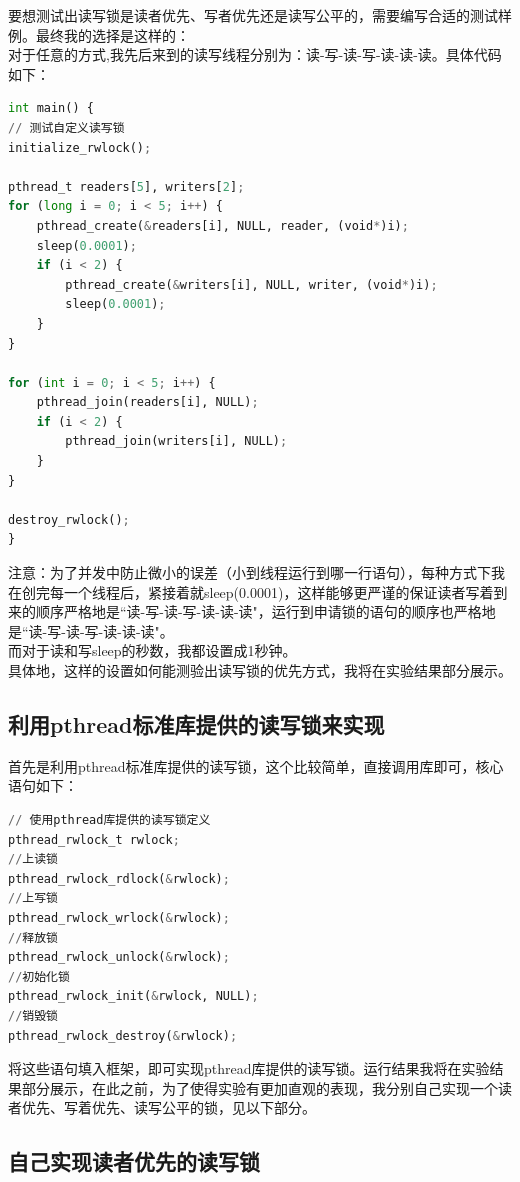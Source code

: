 \documentclass{LabReport}
\begin{document}
要想测试出读写锁是读者优先、写者优先还是读写公平的，需要编写合适的测试样例。最终我的选择是这样的：\\
对于任意的方式,我先后来到的读写线程分别为：读-写-读-写-读-读-读。具体代码如下：
\begin{lstlisting}[language=python,frame=shadowbox]
int main() {
// 测试自定义读写锁
initialize_rwlock();
	
pthread_t readers[5], writers[2];
for (long i = 0; i < 5; i++) {
	pthread_create(&readers[i], NULL, reader, (void*)i);
	sleep(0.0001);
	if (i < 2) {
		pthread_create(&writers[i], NULL, writer, (void*)i);
		sleep(0.0001);
	}
}
	
for (int i = 0; i < 5; i++) {
	pthread_join(readers[i], NULL);
	if (i < 2) {
		pthread_join(writers[i], NULL);
	}
}

destroy_rwlock();
}
\end{lstlisting}

注意：为了并发中防止微小的误差（小到线程运行到哪一行语句），每种方式下我在创完每一个线程后，紧接着就sleep(0.0001)，这样能够更严谨的保证读者写着到来的顺序严格地是``读-写-读-写-读-读-读"，运行到申请锁的语句的顺序也严格地是``读-写-读-写-读-读-读"。\\
而对于读和写sleep的秒数，我都设置成1秒钟。\\
具体地，这样的设置如何能测验出读写锁的优先方式，我将在实验结果部分展示。

\subsection{利用pthread标准库提供的读写锁来实现}

首先是利用pthread标准库提供的读写锁，这个比较简单，直接调用库即可，核心语句如下：

\begin{lstlisting}[language=python,frame=shadowbox]
// 使用pthread库提供的读写锁定义
pthread_rwlock_t rwlock;
//上读锁
pthread_rwlock_rdlock(&rwlock);
//上写锁
pthread_rwlock_wrlock(&rwlock);
//释放锁
pthread_rwlock_unlock(&rwlock);
//初始化锁
pthread_rwlock_init(&rwlock, NULL);
//销毁锁
pthread_rwlock_destroy(&rwlock);
\end{lstlisting}

将这些语句填入框架，即可实现pthread库提供的读写锁。运行结果我将在实验结果部分展示，在此之前，为了使得实验有更加直观的表现，我分别自己实现一个读者优先、写着优先、读写公平的锁，见以下部分。


\subsection{自己实现读者优先的读写锁}
\end{document}
